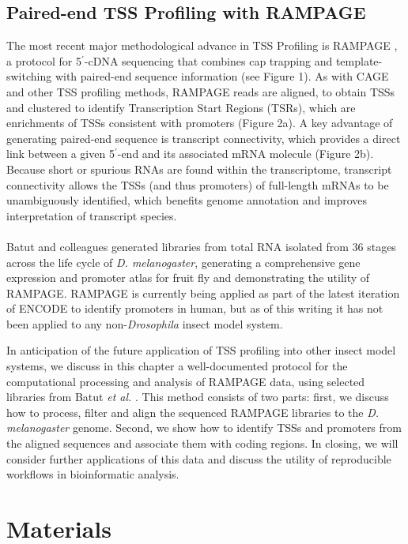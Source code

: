 \documentclass[runningheads,a4paper]{llncs}
\begin{document}
\begin{linenumbers}
\subsection{Paired-end TSS Profiling with RAMPAGE}
The most recent major methodological advance in TSS Profiling is RAMPAGE \cite{Batut:2012kc,Batut:2013fu}, a protocol for 5$^\prime$-cDNA sequencing that combines cap trapping and template-switching with paired-end sequence information (see Figure 1).
As with CAGE and other TSS profiling methods, RAMPAGE reads are aligned, to obtain TSSs and clustered to identify Transcription Start Regions (TSRs), which are enrichments of TSSs consistent with promoters (Figure 2a).
A key advantage of generating paired-end sequence is transcript connectivity, which provides a direct link between a given 5$^\prime$-end and its associated mRNA molecule \cite{Batut:2012kc} (Figure 2b).
Because short or spurious RNAs are found within the transcriptome, transcript connectivity allows the TSSs (and thus promoters) of full-length mRNAs to be unambiguously identified, which benefits genome annotation and improves interpretation of transcript species.
\\
\\
Batut and colleagues \cite{Batut:2012kc} generated libraries from total RNA isolated from 36 stages across the life cycle of \textit{D. melanogaster}, generating a comprehensive gene expression and promoter atlas for fruit fly and demonstrating the utility of RAMPAGE.
RAMPAGE is currently being applied as part of the latest iteration of ENCODE to identify promoters in human, but as of this writing it has not been applied to any non-\textit{Drosophila} insect model system. 

In anticipation of the future application of TSS profiling into other insect model systems, we discuss in this chapter a well-documented protocol for the computational processing and analysis of RAMPAGE data, using selected libraries from Batut \textit{et al.} \cite{Batut:2012kc}. 
This method consists of two parts: first, we discuss how to process, filter and align the sequenced RAMPAGE libraries to the \textit{D. melanogaster} genome. 
Second, we show how to identify TSSs and promoters from the aligned sequences and associate them with coding regions.
In closing, we will consider further applications of this data and discuss the utility of reproducible workflows in bioinformatic analysis.

\section{Materials}


\end{linenumbers}
\end{document}
